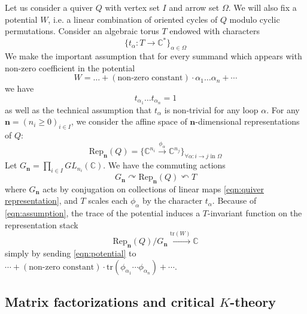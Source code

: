 \documentclass{amsart}
\def\BC{{\mathbb{C}}}
\def\bn{{\boldsymbol{n}}}
\begin{document}
Let us consider a quiver $Q$ with vertex set $I$ and arrow set $\Omega$. We will also fix a potential $W$, i.e. a linear combination of oriented cycles of $Q$ modulo cyclic permutations. Consider an algebraic torus $T$ endowed with characters
\[
\Big\{ t_\alpha : T \rightarrow \BC^* \Big\}_{\alpha \in \Omega}
\]
We make the important assumption that for every summand which appears with non-zero coefficient in the potential
\begin{equation}
\label{eqn:potential}
W = \dots + (\text{non-zero constant}) \cdot \alpha_1 \dots \alpha_n + \cdots
\end{equation}
we have 
\begin{equation}
\label{eqn:assumption}
t_{\alpha_1}\dots t_{\alpha_n} = 1
\end{equation}
as well as the technical assumption that $t_\alpha$ is non-trivial for any loop $\alpha$. For any $\bn = (n_i \geq 0)_{i \in I}$, we consider the affine space of $\bn$-dimensional representations of $Q$:
\begin{equation}
\label{eqn:quiver representation}
\text{Rep}_{\bn}(Q) = \Big\{ \BC^{n_i} \xrightarrow{\phi_\alpha} \BC^{n_j} \Big\}_{\forall \alpha : i \rightarrow j \text{ in } \Omega}
\end{equation}
Let $G_{\bn} = \prod_{i \in I} GL_{n_i}(\BC)$. We have the commuting actions 
\[
G_{\bn} \curvearrowright \text{Rep}_{\bn}(Q) \curvearrowleft T
\]
where $G_{\bn}$ acts by conjugation on collections of linear maps \eqref{eqn:quiver representation}, and $T$ scales each $\phi_\alpha$ by the character $t_\alpha$. Because of \eqref{eqn:assumption}, the trace of the potential induces a $T$-invariant function on the representation stack
\begin{equation}
\label{eqn:stack and function}
\text{Rep}_{\bn}(Q)/G_{\bn} \xrightarrow{\text{tr}(W)} \BC 
\end{equation}
simply by sending \eqref{eqn:potential} to $\cdots + (\text{non-zero constant}) \cdot \text{tr} \left(\phi_{\alpha_1} \cdots \phi_{\alpha_n}\right) + \cdots$.

\medskip 

\subsection{Matrix factorizations and critical $K$-theory}
\label{sub:mf}
\end{document}
